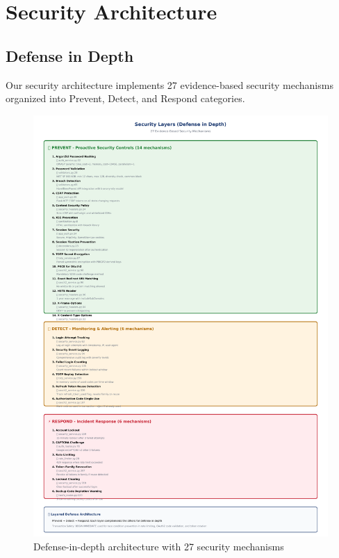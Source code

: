 \documentclass[12pt,a4paper]{article}
\begin{document}
\section{Security Architecture}

\subsection{Defense in Depth}

Our security architecture implements 27 evidence-based security mechanisms organized into Prevent, Detect, and Respond categories.

\begin{figure}[H]
    \centering
    \includegraphics[width=\textwidth]{diagrams/7_security_layers.pdf}
    \caption{Defense-in-depth architecture with 27 security mechanisms}
    \label{fig:security_layers}
\end{figure}
\end{document}
